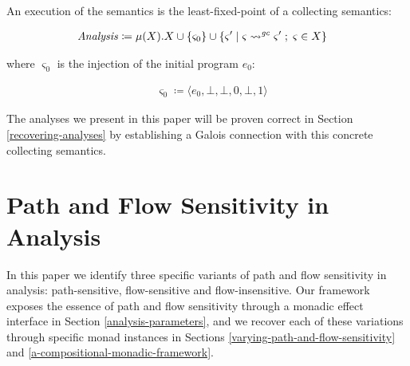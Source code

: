 An execution of the semantics is the least-fixed-point of a collecting
semantics:

\small\begin{align*}
&\hspace{0em}  \operatorname{\mathit{Analysis}}   \coloneqq   \mu (X).X  \cup   \{  \varsigma  _0  \}   \cup   \{   \varsigma '  \;|\;   \varsigma   \rightsquigarrow   ^{ \operatorname{\mathit{gc}} }    \varsigma '  \;;\;   \varsigma   \in  X  \} 
\end{align*}\normalsize

where $ \varsigma  _0 $ is the injection of the initial program $e _0 $:

\small\begin{align*}
&\hspace{0em}  \varsigma  _0   \coloneqq   \langle e _0 , \bot , \bot ,0, \bot ,1 \rangle 
\end{align*}\normalsize

The analyses we present in this paper will be proven correct in Section
\ref{recovering-analyses} by establishing a Galois connection with this
concrete collecting semantics.

\par

\section{Path and Flow Sensitivity in
Analysis}\label{path-and-flow-sensitivity-in-analysis}

\par

In this paper we identify three specific variants of path and flow
sensitivity in analysis: path-sensitive, flow-sensitive and
flow-insensitive. Our framework exposes the essence of path and flow
sensitivity through a monadic effect interface in Section
\ref{analysis-parameters}, and we recover each of these variations
through specific monad instances in Sections
\ref{varying-path-and-flow-sensitivity} and
\ref{a-compositional-monadic-framework}.

\par

